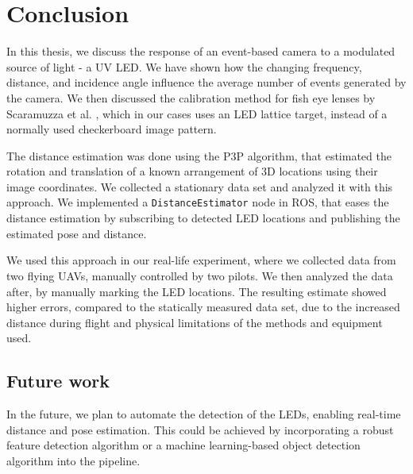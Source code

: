 
\chapter{Conclusion\label{chap:conclusion}}

In this thesis, we discuss the response of an event-based camera to a modulated source of light - a \ac{UV} \ac{LED}.
We have shown how the changing frequency, distance, and incidence angle influence the average number of events generated
by the camera. We then discussed the calibration method for fish eye lenses by Scaramuzza et al. \cite{scaramuzzacalibration},
which in our cases uses an \ac{LED} lattice target, instead of a normally used checkerboard image pattern.

The distance estimation was done using the \ac{P3P} algorithm, that estimated the rotation and translation of a known
arrangement of 3D locations using their image coordinates. We collected a stationary data set and analyzed it with this
approach. We implemented a \texttt{DistanceEstimator} node in \ac{ROS}, that eases the distance estimation by subscribing
to detected \ac{LED} locations and publishing the estimated pose and distance.

We used this approach in our real-life experiment, where we collected data from two flying \ac{UAV}s, manually controlled by two pilots. We then analyzed the data after, by manually marking the \ac{LED} locations. The resulting estimate showed
higher errors, compared to the statically measured data set, due to the increased distance during flight and physical
limitations of the methods and equipment used.

\section{Future work}
In the future, we plan to automate the detection of the \ac{LED}s, enabling real-time distance and pose estimation.
This could be achieved by incorporating a robust feature detection algorithm or a machine learning-based object detection
algorithm into the pipeline.
